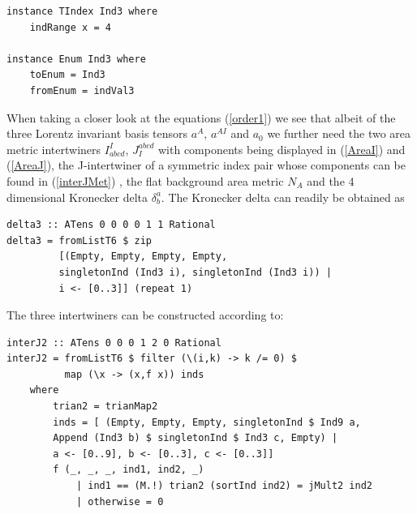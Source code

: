 \documentclass[a4paper,12pt, DIV=14, BCOR=5mm, twoside, headsepline]{scrbook}
\begin{document}
\begin{samepage}
\begin{verbatim}
instance TIndex Ind3 where
    indRange x = 4

instance Enum Ind3 where
    toEnum = Ind3
    fromEnum = indVal3
\end{verbatim} 
\end{samepage}

When taking a closer look at the equations (\ref{order1}) we see that albeit of the three Lorentz invariant basis tensors $a^{A}$, $a^{AI}$ and $a_0$ we further need the two area metric intertwiners $I^I_{abcd}$, $J_I^{abcd}$ with components being displayed in (\ref{AreaI}) and (\ref{AreaJ}), the J-intertwiner of a symmetric index pair whose components can be found in (\ref{interJMet})  , the flat background area metric $N_A$ and the 4 dimensional Kronecker delta $\delta^a_b$. 
The Kronecker delta can readily be obtained as 

\begin{samepage}
\begin{verbatim}
delta3 :: ATens 0 0 0 0 1 1 Rational
delta3 = fromListT6 $ zip
         [(Empty, Empty, Empty, Empty,
         singletonInd (Ind3 i), singletonInd (Ind3 i)) | 
         i <- [0..3]] (repeat 1)
\end{verbatim} 
\end{samepage}

The three intertwiners can be constructed according to:

\begin{samepage}
\begin{verbatim}
interJ2 :: ATens 0 0 0 1 2 0 Rational
interJ2 = fromListT6 $ filter (\(i,k) -> k /= 0) $
          map (\x -> (x,f x)) inds
    where
        trian2 = trianMap2
        inds = [ (Empty, Empty, Empty, singletonInd $ Ind9 a,
        Append (Ind3 b) $ singletonInd $ Ind3 c, Empty) |
        a <- [0..9], b <- [0..3], c <- [0..3]]
        f (_, _, _, ind1, ind2, _)
            | ind1 == (M.!) trian2 (sortInd ind2) = jMult2 ind2
            | otherwise = 0
\end{verbatim} 
\end{samepage}
\end{document}
